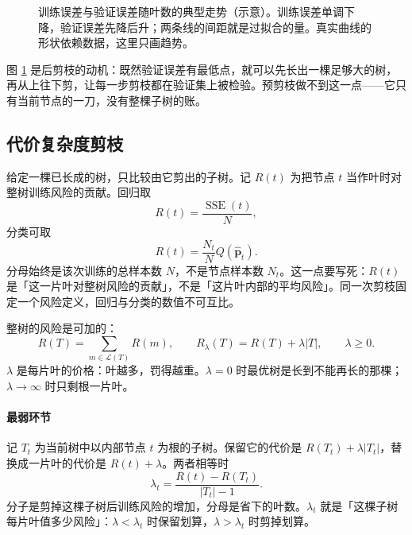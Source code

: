 \documentclass[11pt,a4paper,fontset=windows,zihao=-4]{ctexart}
\newcommand{\bp}{\mathbf{p}}
\DeclareMathOperator{\SSE}{SSE}
\newcommand{\Lcal}{\mathcal{L}}
\begin{document}
\begin{figure}[htbp]
\centering
{}
\caption{训练误差与验证误差随叶数的典型走势（示意）。训练误差单调下降，验证误差先降后升；两条线的间距就是过拟合的量。真实曲线的形状依赖数据，这里只画趋势。}
\label{fig:trainval}
\end{figure}

图 \ref{fig:trainval} 是后剪枝的动机：既然验证误差有最低点，就可以先长出一棵足够大的树，再从上往下剪，让每一步剪枝都在验证集上被检验。预剪枝做不到这一点——它只有当前节点的一刀，没有整棵子树的账。

\subsection{代价复杂度剪枝}

给定一棵已长成的树，只比较由它剪出的子树。记 $R(t)$ 为把节点 $t$ 当作叶时对整树训练风险的贡献。回归取
\[
  R(t)=\frac{\SSE(t)}{N},
\]
分类可取
\[
  R(t)=\frac{N_t}{N}Q(\widehat{\bp}_t).
\]
分母始终是该次训练的总样本数 $N$，不是节点样本数 $N_t$。这一点要写死：$R(t)$ 是「这一片叶对整树风险的贡献」，不是「这片叶内部的平均风险」。同一次剪枝固定一个风险定义，回归与分类的数值不可互比。

整树的风险是可加的：
\begin{equation}
  R(T)=\sum_{m\in\Lcal(T)}R(m),
  \qquad
  R_\lambda(T)=R(T)+\lambda\lvert T\rvert,\qquad \lambda\ge0 .
  \label{eq:ccp}
\end{equation}
$\lambda$ 是每片叶的价格：叶越多，罚得越重。$\lambda=0$ 时最优树是长到不能再长的那棵；$\lambda\to\infty$ 时只剩根一片叶。

\paragraph{最弱环节} 记 $T_t$ 为当前树中以内部节点 $t$ 为根的子树。保留它的代价是 $R(T_t)+\lambda\lvert T_t\rvert$，替换成一片叶的代价是 $R(t)+\lambda$。两者相等时
\begin{equation}
  \lambda_t=\frac{R(t)-R(T_t)}{\lvert T_t\rvert-1}.
  \label{eq:weakest}
\end{equation}
分子是剪掉这棵子树后训练风险的增加，分母是省下的叶数。$\lambda_t$ 就是「这棵子树每片叶值多少风险」：$\lambda<\lambda_t$ 时保留划算，$\lambda>\lambda_t$ 时剪掉划算。
\end{document}
